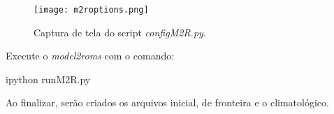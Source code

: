 \begin{figure}[H]
    \centering
    \texttt{[image: m2roptions.png]}
    \caption{Captura de tela do script \textit{configM2R.py}.}
    \label{m2roptions}
\end{figure}
\bigskip

\noindent Execute o \textit{model2roms} com o comando:
\bigskip

\begin{bashcode}
ipython runM2R.py
\end{bashcode}
\bigskip

\noindent Ao finalizar, serão criados os arquivos inicial, de fronteira e o climatológico.

\bigskip
   
